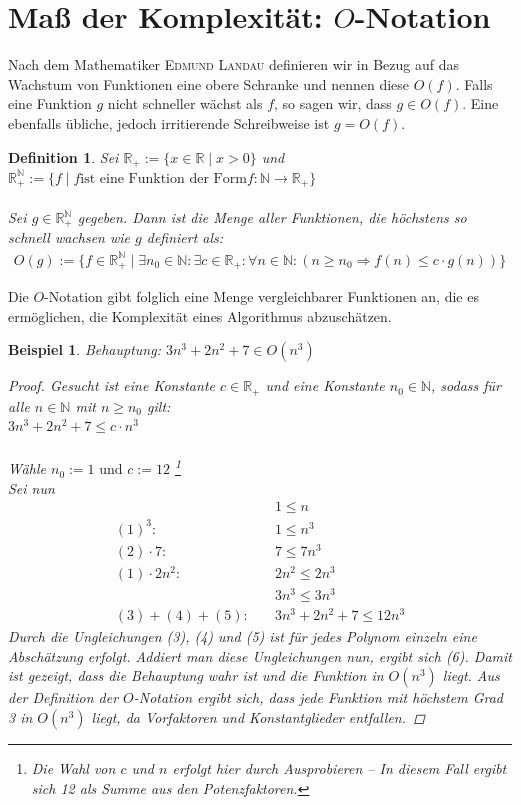 \documentclass[11pt,a4paper]{scrartcl}
\newtheorem{definition}{Definition}
\newtheorem{example}{Beispiel}
\begin{document}
\section{Maß der Komplexität: $O$-Notation}
Nach dem Mathematiker \textsc{Edmund Landau} definieren wir in Bezug auf das Wachstum von Funktionen eine {\glqq}obere Schranke{\grqq} und nennen diese $O(f)$. Falls eine Funktion $g$ nicht schneller wächst als $f$, so sagen wir, dass $g \in O(f)$. Eine ebenfalls übliche, jedoch irritierende Schreibweise ist $g = O(f)$.
\begin{definition}
Sei $\mathbb{R_{+}} := \{ x \in \mathbb{R} \mid x > 0 \}$ und $\mathbb{R_{+}^{\mathbb{N}}} := \{f \mid f \text{ist eine Funktion der Form} f : \mathbb{N} \to \mathbb{R_{+}}\}$ \\\\
Sei $g \in \mathbb{R_{+}^{\mathbb{N}}}$ gegeben. Dann ist die Menge aller Funktionen, die höchstens so schnell wachsen wie $g$ definiert als: \begin{align*}
O(g) := \{f \in \mathbb{R_{+}^{\mathbb{N}}} \mid \exists n_{0} \in \mathbb{N}: \exists c \in \mathbb{R_{+}}: \forall n \in \mathbb{N}: (n \geq n_{0} \Rightarrow f(n) \leq c \cdot g(n))\}
\end{align*}
\end{definition}
Die $O$-Notation gibt folglich eine Menge vergleichbarer Funktionen an, die es ermöglichen, die Komplexität eines Algorithmus abzuschätzen.
\begin{example}
Behauptung:
$3n^{3} + 2n^{2} + 7 \in O(n^{3})$
\begin{proof}

Gesucht ist eine Konstante $c \in \mathbb{R_{+}}$ und eine Konstante $n_{0} \in \mathbb{N}$, sodass für alle $n \in \mathbb{N}$ mit $n \geq n_{0}$ gilt: \\
$3n^{3} + 2n^{2} + 7 \leq c \cdot n^{3}$ \\\\
Wähle $n_{0} := 1 \text{ und } c := 12$ \footnote{Die Wahl von $c$ und $n$ erfolgt hier durch Ausprobieren -- In diesem Fall ergibt sich 12 als Summe aus den Potenzfaktoren.} \\
Sei nun 
\begin{align}
& 1 \leq n \\
(1)^{3}: \quad & 1 \leq n^{3} \\
(2) \cdot 7: \quad & 7 \leq 7n^{3} \\
(1) \cdot 2n^{2}: \quad & 2n^{2} \leq 2n^{3} \\
\quad & 3n^{3} \leq 3n^{3} \\
(3)+(4)+(5): \quad & 3n^{3} + 2n^{2} + 7 \leq 12n^{3}
\end{align}
Durch die Ungleichungen (3), (4) und (5) ist für jedes Polynom einzeln eine Abschätzung erfolgt. Addiert man diese Ungleichungen nun, ergibt sich (6). Damit ist gezeigt, dass die Behauptung wahr ist und die Funktion in $O(n^{3})$ liegt. Aus der Definition der $O$-Notation ergibt sich, dass jede Funktion mit höchstem Grad 3 in $O(n^{3})$ liegt, da Vorfaktoren und Konstantglieder entfallen. 
\end{proof}
\end{example} 
\end{document}

